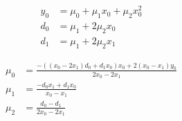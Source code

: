 \begin{align}
  y_0 & = \mu_0+\mu_1 x_0+\mu_2 x_0^{2}  \\
   d_0 & = \mu_1+2 \mu_2 x_0  \\
   d_1 & = \mu_1+2 \mu_2 x_1  
\end{align}

 
\begin{align}
  \mu_0 & = \frac
{ -  \left(  \left( x_0 - 2 x_1 \right)  d_0+d_1 x_0 \right)  x_0+2  \left( x_0 - x_1  \right)  y_0}
{2 x_0 - 2 x_1} \\
   \mu_1 & = \frac
{ - d_0 x_1+d_1 x_0}
{x_0 - x_1} \\
   \mu_2 & = \frac
{d_0 - d_1}
{2 x_0 - 2 x_1} 
\end{align}
